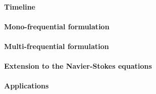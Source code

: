 
\paragraph{Timeline}

\paragraph{Mono-frequential formulation}

\paragraph{Multi-frequential formulation}

\paragraph{Extension to the Navier-Stokes equations}

\paragraph{Applications}
